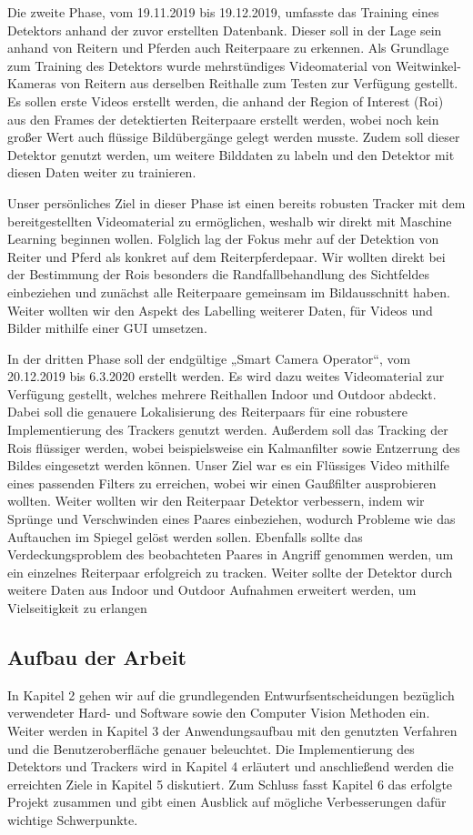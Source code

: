 Die zweite Phase, vom 19.11.2019 bis 19.12.2019, umfasste das Training eines Detektors anhand der zuvor erstellten Datenbank. Dieser soll in der Lage sein anhand von Reitern und Pferden auch Reiterpaare zu erkennen. Als Grundlage zum Training des Detektors wurde mehrstündiges Videomaterial von Weitwinkel-Kameras von Reitern aus derselben Reithalle zum Testen zur Verfügung gestellt. Es sollen erste Videos erstellt werden, die anhand der Region of Interest (Roi) aus den Frames der detektierten Reiterpaare erstellt werden, wobei noch kein großer Wert auch flüssige Bildübergänge gelegt werden musste. Zudem soll dieser Detektor genutzt werden, um weitere Bilddaten zu labeln und den Detektor mit diesen Daten weiter zu trainieren.

Unser persönliches Ziel in dieser Phase ist einen bereits robusten Tracker mit dem bereitgestellten Videomaterial zu ermöglichen, weshalb wir direkt mit Maschine Learning beginnen wollen. Folglich lag der Fokus mehr auf der Detektion von Reiter und Pferd als konkret auf dem Reiterpferdepaar. Wir wollten direkt bei der Bestimmung der Rois besonders die Randfallbehandlung des Sichtfeldes einbeziehen und zunächst alle Reiterpaare gemeinsam im Bildausschnitt haben. Weiter wollten wir den Aspekt des Labelling weiterer Daten, für Videos und Bilder mithilfe einer GUI umsetzen.

In der dritten Phase soll der endgültige „Smart Camera Operator“, vom 20.12.2019 bis 6.3.2020 erstellt werden. Es wird dazu weites Videomaterial zur Verfügung gestellt, welches mehrere Reithallen Indoor und Outdoor abdeckt. Dabei soll die genauere Lokalisierung des Reiterpaars für eine robustere Implementierung des Trackers genutzt werden. Außerdem soll das Tracking der Rois flüssiger werden, wobei beispielsweise ein Kalmanfilter sowie Entzerrung des Bildes eingesetzt werden können.
Unser Ziel war es ein Flüssiges Video mithilfe eines passenden Filters zu erreichen, wobei wir einen Gaußfilter ausprobieren wollten. Weiter wollten wir den Reiterpaar Detektor verbessern, indem wir Sprünge und Verschwinden eines Paares einbeziehen, wodurch Probleme wie das Auftauchen im Spiegel gelöst werden sollen. Ebenfalls sollte das Verdeckungsproblem des beobachteten Paares in Angriff genommen werden, um ein einzelnes Reiterpaar erfolgreich zu tracken. Weiter sollte der Detektor durch weitere Daten aus Indoor und Outdoor Aufnahmen erweitert werden, um Vielseitigkeit zu erlangen



\subsection*{Aufbau der Arbeit}
In Kapitel 2 gehen wir auf die grundlegenden Entwurfsentscheidungen bezüglich verwendeter Hard- und Software sowie den Computer Vision Methoden ein. Weiter werden in Kapitel 3 der Anwendungsaufbau mit den genutzten Verfahren und die Benutzeroberfläche genauer beleuchtet. Die Implementierung des Detektors und Trackers wird in Kapitel 4 erläutert und anschließend werden die erreichten Ziele in Kapitel 5 diskutiert. Zum Schluss fasst Kapitel 6 das erfolgte Projekt zusammen und gibt einen Ausblick auf mögliche Verbesserungen dafür wichtige Schwerpunkte.